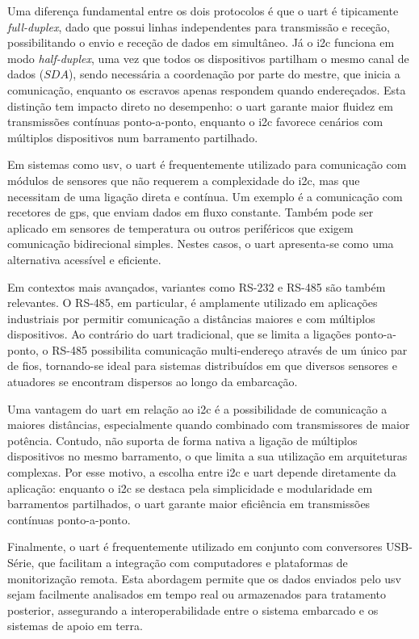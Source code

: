 Uma diferença fundamental entre os dois protocolos é que o \gls{uart} é tipicamente \textit{full-duplex}, dado que possui linhas independentes para transmissão e receção, possibilitando o envio e receção de dados em simultâneo. Já o \gls{i2c} funciona em modo \textit{half-duplex}, uma vez que todos os dispositivos partilham o mesmo canal de dados (\(SDA\)), sendo necessária a coordenação por parte do mestre, que inicia a comunicação, enquanto os escravos apenas respondem quando endereçados. Esta distinção tem impacto direto no desempenho: o \gls{uart} garante maior fluidez em transmissões contínuas ponto-a-ponto, enquanto o \gls{i2c} favorece cenários com múltiplos dispositivos num barramento partilhado.

Em sistemas como \gls{usv}, o \gls{uart} é frequentemente utilizado para comunicação com módulos de sensores que não requerem a complexidade do \gls{i2c}, mas que necessitam de uma ligação direta e contínua. Um exemplo é a comunicação com recetores de \gls{gps}, que enviam dados em fluxo constante. Também pode ser aplicado em sensores de temperatura ou outros periféricos que exigem comunicação bidirecional simples. Nestes casos, o \gls{uart} apresenta-se como uma alternativa acessível e eficiente.

Em contextos mais avançados, variantes como RS-232 e RS-485 são também relevantes. O RS-485, em particular, é amplamente utilizado em aplicações industriais por permitir comunicação a distâncias maiores e com múltiplos dispositivos. Ao contrário do \gls{uart} tradicional, que se limita a ligações ponto-a-ponto, o RS-485 possibilita comunicação multi-endereço através de um único par de fios, tornando-se ideal para sistemas distribuídos em que diversos sensores e atuadores se encontram dispersos ao longo da embarcação.

Uma vantagem do \gls{uart} em relação ao \gls{i2c} é a possibilidade de comunicação a maiores distâncias, especialmente quando combinado com transmissores de maior potência. Contudo, não suporta de forma nativa a ligação de múltiplos dispositivos no mesmo barramento, o que limita a sua utilização em arquiteturas complexas. Por esse motivo, a escolha entre \gls{i2c} e \gls{uart} depende diretamente da aplicação: enquanto o \gls{i2c} se destaca pela simplicidade e modularidade em barramentos partilhados, o \gls{uart} garante maior eficiência em transmissões contínuas ponto-a-ponto.

Finalmente, o \gls{uart} é frequentemente utilizado em conjunto com conversores USB-Série, que facilitam a integração com computadores e plataformas de monitorização remota. Esta abordagem permite que os dados enviados pelo \gls{usv} sejam facilmente analisados em tempo real ou armazenados para tratamento posterior, assegurando a interoperabilidade entre o sistema embarcado e os sistemas de apoio em terra.


